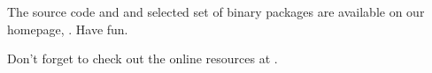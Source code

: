 \documentclass[11pt,a4paper,twoside]{gmxmanual}
\begin{document}
The {\gromacs} source code and and selected set of binary packages are
available on our homepage, \wwwpage. Have fun.

\newpage
%
\tableofcontents

%
%
\cleardoublepage
{}










%
%
\appendix






%


%
%
\cleardoublepage
{}





%
%
\cleardoublepage
{}

\renewcommand{\see}[2]{\mbox{} \mbox{\textit{see} #1}}
\printindex

\newpage
\pagestyle{empty}
\phantom{ }

\vfill

\begin{center}
Don't forget to check out the online resources at \wwwpage.
\end{center}
\cleardoublepage
\end{document}
